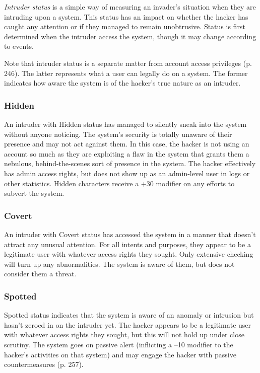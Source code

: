 \textit{Intruder status} is a simple way of measuring an 
invader's situation when they are intruding upon 
a system. This status has an impact on whether the 
hacker has caught any attention or if they managed 
to remain unobtrusive. Status is first determined when 
the intruder access the system, though it may change 
according to events.

Note that intruder status is a separate matter from 
account access privileges (p. 246). The latter represents 
what a user can legally do on a system. The former 
indicates how aware the system is of the hacker's true 
nature as an intruder.

\subsubsection{Hidden}

An intruder with Hidden status has managed to silently
sneak into the system without anyone noticing. The
system's security is totally unaware of their presence 
and may not act against them. In this case, the hacker 
is not using an account so much as they are exploiting
a flaw in the system that grants them a nebulous,
behind-the-scenes sort of presence in the system. The 
hacker effectively has admin access rights, but does 
not show up as an admin-level user in logs or other 
statistics. Hidden characters receive a +30 modifier on 
any efforts to subvert the system.

\subsubsection{Covert}

An intruder with Covert status has accessed the 
system in a manner that doesn't attract any unusual 
attention. For all intents and purposes, they appear 
to be a legitimate user with whatever access rights 
they sought. Only extensive checking will turn up any 
abnormalities. The system is aware of them, but does 
not consider them a threat.

\subsubsection{Spotted}

Spotted status indicates that the system is aware of an 
anomaly or intrusion but hasn't zeroed in on the intruder
yet. The hacker appears to be a legitimate user
with whatever access rights they sought, but this will 
not hold up under close scrutiny. The system goes on 
passive alert (inflicting a –10 modifier to the hacker's 
activities on that system) and may engage the hacker 
with passive countermeasures (p. 257).

